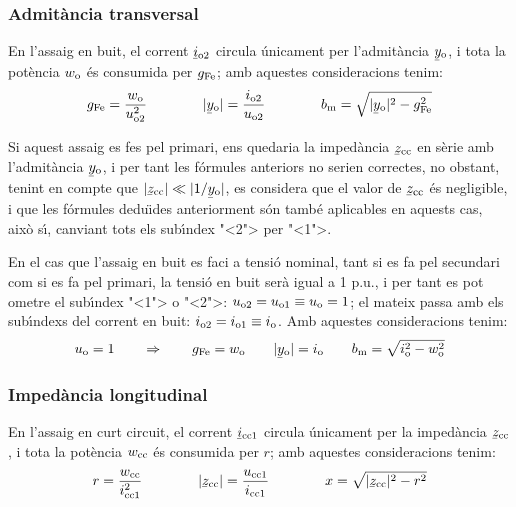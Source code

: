 \subsubsection{Admit\`{a}ncia transversal}

En l'assaig en buit, el corrent $\cmplx{i}\ped{o2}$ circula
\'{u}nicament per l'admit\`{a}ncia $\cmplx{y}\ped{o}$, i tota la pot\`{e}ncia
$w_\mathrm{o}$ \'{e}s consumida per $g_\mathrm{Fe}$; amb aquestes consideracions
tenim:
\begin{equation}
    g\ped{Fe} = \frac{w\ped{o}}{u\ped{o2}^2} \qquad\qquad
    |\cmplx{y}\ped{o}| = \frac{i\ped{o2}}{u\ped{o2}}
    \qquad\qquad
    b\ped{m} = \sqrt{|\cmplx{y}\ped{o}|^2 - g\ped{Fe}^2}
\end{equation}

Si aquest assaig es fes pel primari, ens quedaria la imped\`{a}ncia
$\cmplx{z}\ped{cc}$ en s\`{e}rie amb l'admit\`{a}ncia $\cmplx{y}\ped{o}$, i
per tant les f\'{o}rmules anteriors no serien correctes, no obstant,
tenint en compte que $|\cmplx{z}\ped{cc}| \ll |1/\cmplx{y}\ped{o}|$,
es  considera que el valor de $\cmplx{z}\ped{cc}$ \'{e}s negligible, i
que les f\'{o}rmules dedu\"{\i}des anteriorment s\'{o}n tamb\'{e} aplicables en
aquests cas, aix\`{o} s\'{\i}, canviant tots els sub\'{\i}ndex {"<}2{">} per {"<}1{">}.

En el cas que l'assaig en buit es faci a tensi\'{o} nominal, tant  si es
fa pel secundari com si es fa pel primari, la tensi\'{o} en buit ser\`{a}
igual a 1 p.u., i per tant es pot ometre el sub\'{\i}ndex {"<}1{">} o {"<}2{">}:
$u_\mathrm{o2} = u_\mathrm{o1} \equiv u_\mathrm{o} = 1$; el mateix passa amb els
sub\'{\i}ndexs del corrent en buit: $i_\mathrm{o2} = i_\mathrm{o1} \equiv
i_\mathrm{o}$. Amb aquestes consideracions tenim:
\begin{equation}
    u\ped{o} = 1 \qquad \Rightarrow \qquad g\ped{Fe} = w\ped{o} \qquad
    |\cmplx{y}\ped{o}| = i\ped{o} \qquad
    b\ped{m} = \sqrt{i\ped{o}^2 - w\ped{o}^2}
    \label{eq:assaig-buit-nomianl}
\end{equation}

\subsubsection{Imped\`{a}ncia longitudinal}

En l'assaig en curt circuit, el corrent $\cmplx{i}\ped{cc1}$ circula
\'{u}nicament per la imped\`{a}ncia $\cmplx{z}\ped{cc}$, i tota la pot\`{e}ncia
$w_\mathrm{cc}$ \'{e}s consumida per $r$; amb aquestes consideracions tenim:
\begin{equation}
    r = \frac{w\ped{cc}}{i\ped{cc1}^2} \qquad\qquad
    |\cmplx{z}\ped{cc}| = \frac{u\ped{cc1}}{i\ped{cc1}} \qquad\qquad
    x = \sqrt{|\cmplx{z}\ped{cc}|^2 - r^2}
\end{equation}

